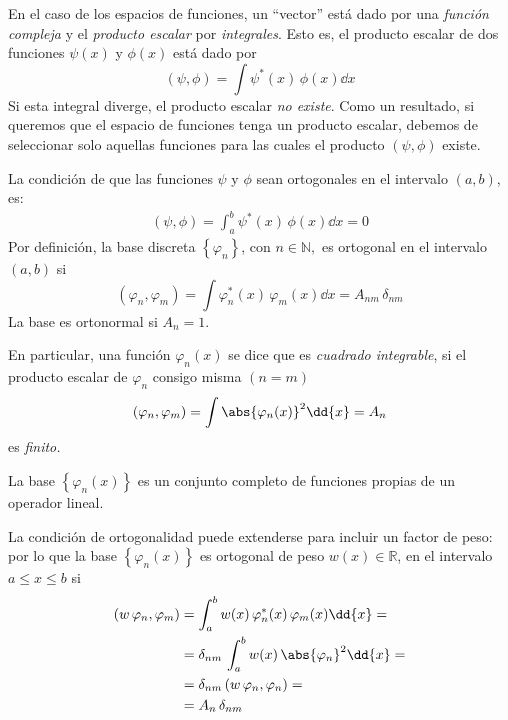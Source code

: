 En el caso de los espacios de funciones, un \enquote{vector} está dado por una \emph{función compleja} y el \emph{producto escalar} por \emph{integrales}. Esto es, el producto escalar de dos funciones $\psi (x)$ y $\phi (x)$ está dado por
\begin{equation}
(\psi, \phi) = \int \psi^{*} (x) \, \phi (x) \dd{x}
\label{eq:ecuacion_02_21}
\end{equation}
Si esta integral diverge, el producto escalar \emph{no existe}. Como un resultado, si queremos que el espacio de funciones tenga un producto escalar, debemos de seleccionar solo aquellas funciones para las cuales el producto $(\psi, \phi)$ existe.
\par
La condición de que las funciones $\psi$ y $\phi$ sean ortogonales en el intervalo $(a, b)$, es:
\begin{align*}
(\psi, \phi) = \int_{a}^{b} \psi^{*} (x) \, \phi (x) \dd{x} = 0
\end{align*}
Por definición, la base discreta $\left\{ \varphi_{n} \right\}$, con $n \in \mathbb{N},$ es ortogonal en el intervalo $(a, b)$ si
\begin{equation}
(\varphi_{n}, \varphi_{m}) = \int \varphi_{n}^{*} (x) \, \varphi_{m} (x) \dd{x} = A_{nm} \, \delta_{nm}
\label{eq:ecuacion_05_02}
\end{equation}
La base es ortonormal si  $A_{n} = 1$.
\par
En particular, una función $\varphi_{n} (x)$ se dice que es \emph{cuadrado integrable}, si el producto escalar de $\varphi_{n}$ consigo misma $(n = m)$
\begin{equation}
(\varphi_{n}, \varphi_{m}) = \int \abs{\varphi_{n} (x)}^{2} \dd{x} =  A_{n}
\label{eq:ecuacion_02_22}
\end{equation}
es \emph{finito.}
\par
La base $\left\{ \varphi_{n} (x) \right\}$ es un conjunto completo de funciones propias de un operador lineal.
\par
La condición de ortogonalidad puede extenderse para incluir un factor de peso: por lo que la base $\left\{ \varphi_{n} (x) \right\}$ es ortogonal de peso $w(x) \in \mathbb{R}$, en el intervalo $a \leq x \leq b$ si
\begin{align*}
(w \, \varphi_{n}, \varphi_{m}) &= \int_{a}^{b} w(x) \,  \varphi_{n}^{*} (x) \, \varphi_{m} (x) \dd{x} = \\
&=\delta_{nm} \, \int_{a}^{b} w(x) \, \abs{\varphi_{n}}^{2} \dd{x} = \\
&= \delta_{nm} \, (w \, \varphi_{n}, \varphi_{n}) = \\
&= A_{n} \, \delta_{nm}
\end{align*}
